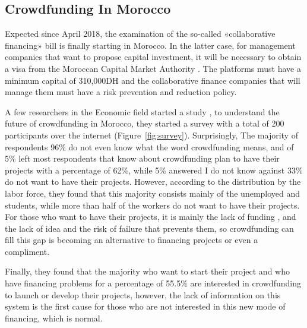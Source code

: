 \subsection*{ Crowdfunding In Morocco }
Expected since April 2018, the examination of the so-called «collaborative financing» bill is finally starting in Morocco. In the latter case, for management companies that want to propose capital investment, it will be necessary to obtain a visa from the Moroccan Capital Market Authority . The platforms must have a minimum capital of 310,000DH and the collaborative finance companies that will manage them must have a risk prevention and reduction policy.

A few researchers in the Economic field started a study \cite{crowdMorocco}, to understand the future of crowdfunding in Morocco, they started a survey with a total of 200 participants over the internet (Figure~\ref{fig:survey}). Surprisingly,  The majority of respondents 96\% do not even know what the word crowdfunding means, and of 5\% left most respondents that know about crowdfunding plan to have their projects with a percentage of 62\%, while 5\% answered I do not know against 33\% do not want to have their projects. However, according to the distribution by the labor force, they found that this majority consists mainly of the unemployed and students, while more than half of the workers do not want to have their projects. For those who want to have their projects, it is mainly the lack of funding , and the lack of idea and the risk of failure that prevents them, so crowdfunding can fill this gap is becoming an alternative to financing projects or even a compliment.

Finally, they found that the majority who want to start their project and who have financing problems for a percentage of 55.5\% are interested in crowdfunding to launch or develop their projects, however, the lack of information on this system is the first cause for those who are not interested in this new mode of financing, which is normal.




   
   
